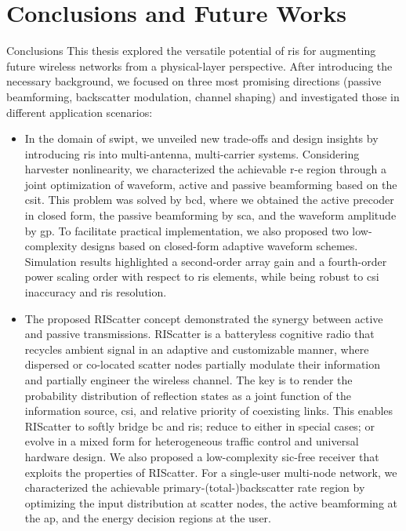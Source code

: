 
\chapter{Conclusions and Future Works}\label{ch:conclusions}

\begin{section}{Conclusions}
	This thesis explored the versatile potential of \gls{ris} for augmenting future wireless networks from a physical-layer perspective.
	After introducing the necessary background, we focused on three most promising directions (passive beamforming, backscatter modulation, channel shaping) and investigated those in different application scenarios:
	\begin{itemize}
		\item In the domain of \gls{swipt}, we unveiled new trade-offs and design insights by introducing \gls{ris} into multi-antenna, multi-carrier systems. Considering harvester nonlinearity, we characterized the achievable \gls{r-e} region through a joint optimization of waveform, active and passive beamforming based on the \gls{csit}. This problem was solved by \gls{bcd}, where we obtained the active precoder in closed form, the passive beamforming by \gls{sca}, and the waveform amplitude by \gls{gp}. To facilitate practical implementation, we also proposed two low-complexity designs based on closed-form adaptive waveform schemes. Simulation results highlighted a second-order array gain and a fourth-order power scaling order with respect to \gls{ris} elements, while being robust to \gls{csi} inaccuracy and \gls{ris} resolution.
		\item The proposed RIScatter concept demonstrated the synergy between active and passive transmissions. RIScatter is a batteryless cognitive radio that recycles ambient signal in an adaptive and customizable manner, where dispersed or co-located scatter nodes partially modulate their information and partially engineer the wireless channel.
		The key is to render the probability distribution of reflection states as a joint function of the information source, \gls{csi}, and relative priority of coexisting links.
		This enables RIScatter to softly bridge \gls{bc} and \gls{ris}; reduce to either in special cases; or evolve in a mixed form for heterogeneous traffic control and universal hardware design.
		We also proposed a low-complexity \gls{sic}-free receiver that exploits the properties of RIScatter.
		For a single-user multi-node network, we characterized the achievable primary-(total-)backscatter rate region by optimizing the input distribution at scatter nodes, the active beamforming at the \gls{ap}, and the energy decision regions at the user.

\end{itemize}
\end{section}

